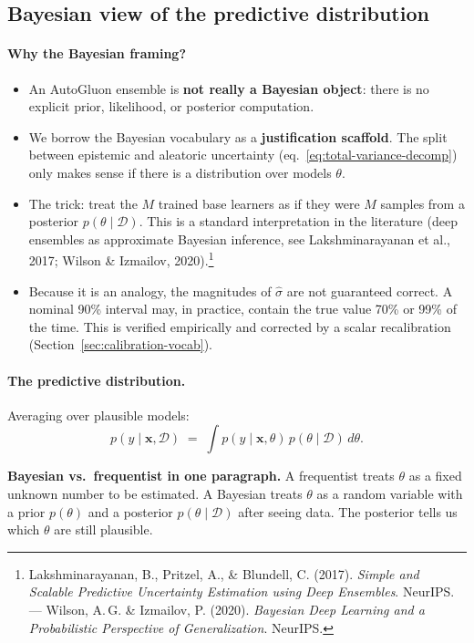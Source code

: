 \documentclass[11pt,a4paper]{article}
\begin{document}
\subsection{Bayesian view of the predictive distribution}

\paragraph{Why the Bayesian framing?}
\begin{itemize}
    \item An AutoGluon ensemble is \textbf{not really a Bayesian object}: there is no explicit prior, likelihood, or posterior computation.
    \item We borrow the Bayesian vocabulary as a \textbf{justification scaffold}. The split between epistemic and aleatoric uncertainty (eq.~\eqref{eq:total-variance-decomp}) only makes sense if there is a distribution over models $\theta$.
    \item The trick: treat the $M$ trained base learners as if they were $M$ samples from a posterior $p(\theta \mid \mathcal{D})$. This is a standard interpretation in the literature (deep ensembles as approximate Bayesian inference, see Lakshminarayanan et al., 2017; Wilson \& Izmailov, 2020).\footnote{Lakshminarayanan, B., Pritzel, A., \& Blundell, C. (2017). \emph{Simple and Scalable Predictive Uncertainty Estimation using Deep Ensembles}. NeurIPS. --- Wilson, A.\,G. \& Izmailov, P. (2020). \emph{Bayesian Deep Learning and a Probabilistic Perspective of Generalization}. NeurIPS.}
    \item Because it is an analogy, the magnitudes of $\hat\sigma$ are not guaranteed correct. A nominal 90\% interval may, in practice, contain the true value 70\% or 99\% of the time. This is verified empirically and corrected by a scalar recalibration (Section~\ref{sec:calibration-vocab}).
\end{itemize}

\paragraph{The predictive distribution.} Averaging over plausible models:
\begin{equation}
p(y \mid \bm x, \mathcal{D}) \;=\; \int p(y \mid \bm x, \theta) \, p(\theta \mid \mathcal{D}) \, d\theta .
\label{eq:posterior-predictive}
\end{equation}

\begin{recapbox}
\textbf{Bayesian vs.\ frequentist in one paragraph.} A frequentist treats $\theta$ as a fixed unknown number to be estimated. A Bayesian treats $\theta$ as a random variable with a prior $p(\theta)$ and a posterior $p(\theta \mid \mathcal{D})$ after seeing data. The posterior tells us which $\theta$ are still plausible.
\end{recapbox}
\end{document}
